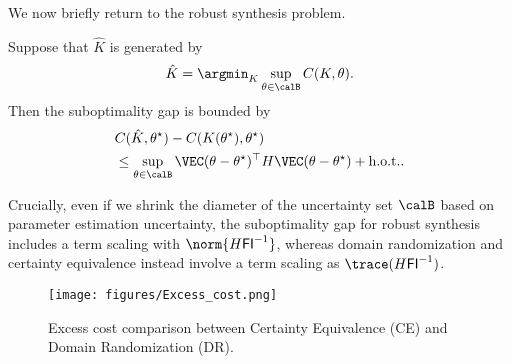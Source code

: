 We now briefly return to the robust synthesis problem. 

\begin{theorem}
    Suppose that $\hat K$ is generated by
    \begin{align*}
        \hat K = \argmin_K \sup_{\theta \in \calB} C(K, \theta).
    \end{align*}
    Then the suboptimality gap is bounded by
    \begin{align*}
        &C(\hat K, \theta^\star) - C(K(\theta^\star), \theta^\star) \\
        &\leq \sup_{\theta \in \calB} \VEC(\theta - \theta^\star)^\top H \VEC(\theta - \theta^\star) + \text{h.o.t.}.
    \end{align*}
\end{theorem}

Crucially, even if we shrink the diameter of the uncertainty set $\calB$ based on parameter estimation uncertainty, the suboptimality gap for robust synthesis includes a term scaling with $\norm{H \mathsf{FI}^{-1}}$, whereas domain randomization and certainty equivalence instead involve a term scaling as $\trace(H \mathsf{FI}^{-1})$.

\begin{figure}
    \centering
    \texttt{[image: figures/Excess\_cost.png]}
    \caption{Excess cost comparison between Certainty Equivalence (CE) and Domain Randomization (DR).}
    \label{fig:excess cost}
\end{figure}



